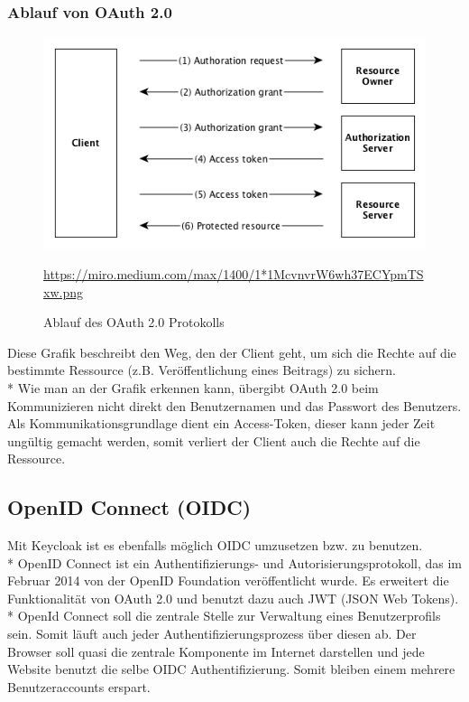 \subsubsection{Ablauf von OAuth 2.0}
\begin{figure}[htp]
    \centering
    \includegraphics[scale=0.8]{pics/Ablauf_OAuth2.png}
    \caption{Ablauf des OAuth 2.0 Protokolls}
    \small \url{https://miro.medium.com/max/1400/1*1McvnvrW6wh37ECYpmTSxw.png} 
    \label{fig:impl:OAuth2Protocoll}
\end{figure}

Diese Grafik beschreibt den Weg, den der Client geht, um sich die Rechte auf die bestimmte Ressource (z.B. Veröffentlichung eines Beitrags) zu sichern. \\*
Wie man an der Grafik erkennen kann, übergibt OAuth 2.0 beim Kommunizieren nicht direkt den Benutzernamen und das Passwort des Benutzers. 
Als Kommunikationsgrundlage dient ein Access-Token, dieser kann jeder Zeit ungültig gemacht werden, somit verliert der Client auch die Rechte auf die Ressource. \cite{KeycloakCodeCentric}

\subsection{OpenID Connect (OIDC)}
Mit Keycloak ist es ebenfalls möglich OIDC umzusetzen bzw. zu benutzen. \\*
OpenID Connect ist ein Authentifizierungs- und Autorisierungsprotokoll, das im Februar 2014 von der OpenID Foundation veröffentlicht wurde.
Es erweitert die Funktionalität von OAuth 2.0 und benutzt dazu auch JWT (JSON Web Tokens). \\*
OpenId Connect soll die zentrale Stelle zur Verwaltung eines Benutzerprofils sein. Somit läuft auch jeder Authentifizierungsprozess über diesen ab.
Der Browser soll quasi die zentrale Komponente im Internet darstellen und jede Website benutzt die selbe OIDC Authentifizierung. Somit bleiben einem mehrere Benutzeraccounts erspart. \cite{KeycloakCodeCentric}
\pagebreak

